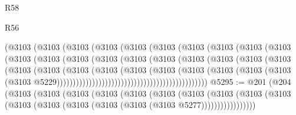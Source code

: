 \begin{lexlean}{R58}
\begin{lexlean}{R56}
\begin{coremodule}
{{{{{{{{{{{{{{{{{{{{{{{{{{{{{{{{{{{{{{{{{{{{{{{{{{{{{{{{{{{{{{{{{{{{{{{{{{{{{{{{{{{{{{{{{{{{{{{{{{{{{{{{{{{{{{{{{{{{{{{{{{{{{{{{{{{{{{{{{{{{{{{{{{{{{{{{{{{{{{{{{{{{{{{{{{{{{{{{{{{{{{{{{{{{{{{{{{{{{{{{{{{{{{{{{{{                                    (@3103
                                      (@3103
                                        (@3103
                                          (@3103
                                            (@3103
                                              (@3103
                                                (@3103
                                                  (@3103
                                                    (@3103
                                                      (@3103
                                                        (@3103
                                                          (@3103
                                                            (@3103
                                                              (@3103
                                                                (@3103
                                                                  (@3103
                                                                    (@3103
                                                                      (@3103
                                                                        (@3103
                                                                          (@3103
                                                                            (@3103
                                                                              (@3103
                                                                                (@3103
                                                                                  (@3103
                                                                                    (@3103
                                                                                      (@3103
                                                                                        (@3103
                                                                                          (@3103
                                                                                            (@3103
                                                                                              (@3103
                                                                                                (@3103
                                                                                                  @5229)))))))))))))))))))))))))))))))))))))))))))))))
@5295 := @201
    (@204
      (@3103
        (@3103
          (@3103
            (@3103
              (@3103
                (@3103
                  (@3103
                    (@3103
                      (@3103 (@3103 (@3103 (@3103 (@3103 (@3103 (@3103 (@3103 @5277)))))))))))))))))
}}}}}}}}}}}}}}}}}}}}}}}}}}}}}}}}}}}}}}}}}}}}}}}}}}}}}}}}}}}}}}}}}}}}}}}}}}}}}}}}}}}}}}}}}}}}}}}}}}}}}}}}}}}}}}}}}}}}}}}}}}}}}}}}}}}}}}}}}}}}}}}}}}}}}}}}}}}}}}}}}}}}}}}}}}}}}}}}}}}}}}}}}}}}}}}}}}}}}}}}}}}}}}}}}}}
\end{coremodule}
\end{lexlean}
\end{lexlean}
